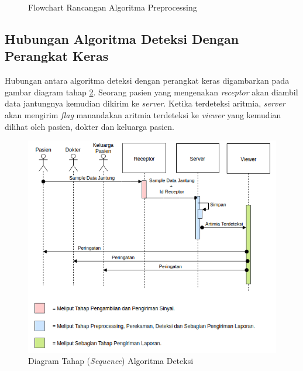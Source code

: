 \begin{figure}[H]
\centering
    \caption{Flowchart Rancangan Algoritma Preprocessing}
	\label{flow:fig_preproc_algorithm}
\end{figure}

\subsection{Hubungan Algoritma Deteksi Dengan Perangkat Keras}
Hubungan antara algoritma deteksi dengan perangkat keras digambarkan pada gambar diagram tahap \ref{seq:fig_detect_algorithm2}. Seorang pasien yang mengenakan \textit{receptor} akan diambil data jantungnya kemudian dikirim ke \textit{server}. Ketika terdeteksi aritmia, \textit{server} akan mengirim \textit{flag} manandakan aritmia terdeteksi ke \textit{viewer} yang kemudian dilihat oleh pasien, dokter dan keluarga pasien.
\begin{figure}[H]
	\centering
	\includegraphics[scale=0.7]{images/sequence1.png}
	\caption{Diagram Tahap (\textit{Sequence}) Algoritma Deteksi}
	\label{seq:fig_detect_algorithm2}
\end{figure}

